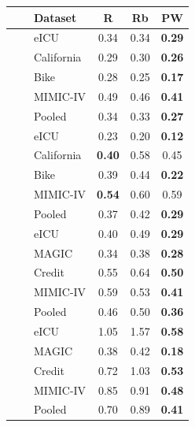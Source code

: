 \begin{tabular}{cclccc}
\toprule
 & & Dataset & R & Rb & PW \\
\midrule
{} &  & eICU & 0.34 & 0.34 & \textbf{0.29} \\
 &  & California & 0.29 & 0.30 & \textbf{0.26} \\
 &  & Bike & 0.28 & 0.25 & \textbf{0.17} \\
 &  & MIMIC-IV & 0.49 & 0.46 & \textbf{0.41} \\
\addlinespace[2pt]
 &  & Pooled & 0.34 & 0.33 & \textbf{0.27} \\
\cmidrule(l){2-6}
 &  & eICU & 0.23 & 0.20 & \textbf{0.12} \\
 &  & California & \textbf{0.40} & 0.58 & 0.45 \\
 &  & Bike & 0.39 & 0.44 & \textbf{0.22} \\
 &  & MIMIC-IV & \textbf{0.54} & 0.60 & 0.59 \\
\addlinespace[2pt]
 &  & Pooled & 0.37 & 0.42 & \textbf{0.29} \\
\midrule
{} &  & eICU & 0.40 & 0.49 & \textbf{0.29} \\
 &  & MAGIC & 0.34 & 0.38 & \textbf{0.28} \\
 &  & Credit & 0.55 & 0.64 & \textbf{0.50} \\
 &  & MIMIC-IV & 0.59 & 0.53 & \textbf{0.41} \\
\addlinespace[2pt]
 &  & Pooled & 0.46 & 0.50 & \textbf{0.36} \\
\cmidrule(l){2-6}
 &  & eICU & 1.05 & 1.57 & \textbf{0.58} \\
 &  & MAGIC & 0.38 & 0.42 & \textbf{0.18} \\
 &  & Credit & 0.72 & 1.03 & \textbf{0.53} \\
 &  & MIMIC-IV & 0.85 & 0.91 & \textbf{0.48} \\
\addlinespace[2pt]
 &  & Pooled & 0.70 & 0.89 & \textbf{0.41} \\
\bottomrule
\end{tabular}
